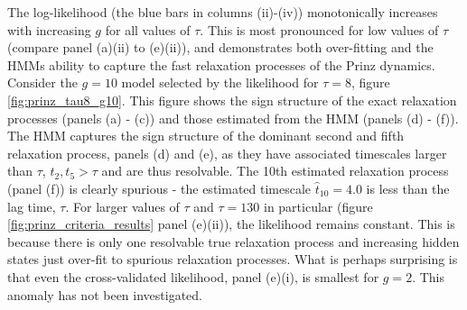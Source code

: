 The log-likelihood (the blue bars in columns (ii)-(iv)) monotonically increases with increasing $g$ for all values of $\tau$. This is most pronounced for low values of $\tau$ (compare panel (a)(ii) to (e)(ii)), and demonstrates both over-fitting and the HMMs ability to capture the fast relaxation processes of the Prinz dynamics. Consider the $g=10$ model selected by the likelihood for $\tau=8$, figure \ref{fig:prinz_tau8_g10}. This figure shows the sign structure of the exact relaxation processes (panels (a) - (c)) and those estimated from the HMM (panels (d) - (f)).  The HMM captures the sign structure of the dominant second and fifth relaxation process, panels (d) and (e), as they have associated timescales larger than $\tau$, $t_{2}, t_{5} > \tau$ and are thus resolvable. The 10th estimated relaxation process (panel (f)) is clearly spurious - the estimated timescale $\hat{t}_{10} = 4.0$ is less than the lag time, $\tau$. For larger values of $\tau$ and $\tau= 130$ in particular (figure \ref{fig:prinz_criteria_results} panel (e)(ii)), the likelihood remains constant. This is because there is only one resolvable true relaxation process  and increasing hidden states just over-fit to spurious relaxation processes. What is perhaps surprising is that even the cross-validated likelihood, panel (e)(i), is smallest for $g=2$. This anomaly has not been investigated. 

